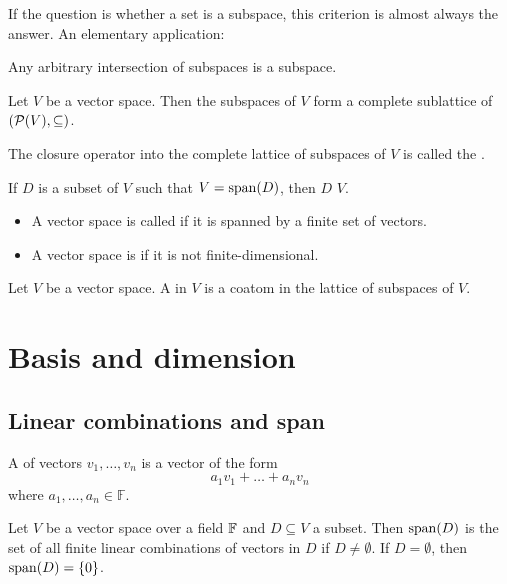 If the question is whether a set is a subspace, this criterion is almost always the answer. An elementary application:
\begin{proposition}
Any arbitrary intersection of subspaces is a subspace.
\end{proposition}
\begin{corollary}
Let $V$ be a vector space. Then the subspaces of $V$ form a complete sublattice of $\sSet{\powerset(V),\subseteq}$.
\end{corollary}

\begin{definition}
The closure operator into the complete lattice of subspaces of $V$ is called the .

If $D$ is a subset of $V$ such that $V = \operatorname{span}(D)$, then $D$  $V$.

\begin{itemize}
\item A vector space is called  if it is spanned by a finite set of vectors.
\item A vector space is  if it is not finite-dimensional.
\end{itemize}
\end{definition}

\begin{definition}
Let $V$ be a vector space. A  in $V$ is a coatom in the lattice of subspaces of $V$.
\end{definition}


\section{Basis and dimension}
\subsection{Linear combinations and span}
\begin{definition}
A  of vectors $v_1, \ldots, v_n$ is a vector of the form
\[ a_1v_1 + \ldots + a_nv_n \]
where $a_1, \ldots, a_n \in \mathbb{F}$.
\end{definition}

\begin{proposition}
Let $V$ be a vector space over a field $\mathbb{F}$ and $D\subseteq V$ a subset. Then $\operatorname{span}(D)$ is the set of all finite linear combinations of vectors in $D$ if $D \neq \emptyset$. If $D = \emptyset$, then $\operatorname{span}(D) = \{0\}$.
\end{proposition}

